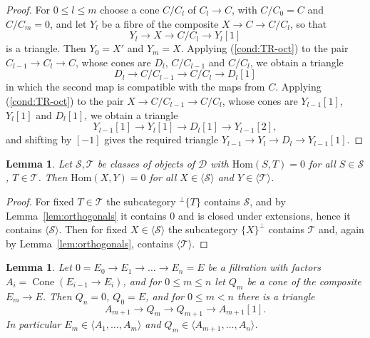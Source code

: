 \documentclass[12pt]{amsart}
\newcommand{\condref}[1]{\textup{(\ref{#1})}}
\newtheorem{lemma}[theorem]{Lemma}
\numberwithin{theorem}{section}
\theoremstyle{definition}
\newcommand{\Hom}{\mathrm{Hom}}
\newcommand{\calD}{\mathcal{D}}
\newcommand{\Cone}{\operatorname{Cone}}
\begin{document}
	\begin{proof}
		For $0 \leqslant l \leqslant m$ choose a cone $C / C_l$ of $C_l \to C$, with $C / C_0 = C$ and $C / C_m = 0$, and let $Y_l$ be a fibre of the composite $X \to C \to C / C_l$, so that
		\[
		Y_l \longrightarrow X \longrightarrow C / C_l \longrightarrow Y_l[1]
		\]
		is a triangle.
		Then $Y_0 = X'$ and $Y_m = X$.
		Applying \condref{cond:TR-oct} to the pair $C_{l-1} \to C_l \to C$, whose cones are $D_l$, $C / C_{l-1}$ and $C / C_l$, we obtain a triangle
		\[
		D_l \longrightarrow C / C_{l-1} \longrightarrow C / C_l \longrightarrow D_l[1]
		\]
		in which the second map is compatible with the maps from $C$.
		Applying \condref{cond:TR-oct} to the pair $X \to C / C_{l-1} \to C / C_l$, whose cones are $Y_{l-1}[1]$, $Y_l[1]$ and $D_l[1]$, we obtain a triangle
		\[
		Y_{l-1}[1] \longrightarrow Y_l[1] \longrightarrow D_l[1] \longrightarrow Y_{l-1}[2] ,
		\]
		and shifting by $[-1]$ gives the required triangle $Y_{l-1} \to Y_l \to D_l \to Y_{l-1}[1]$.
	\end{proof}
	
	\begin{lemma}
		\label{lem:devissage}
		Let $\mathcal{S}, \mathcal{T}$ be classes of objects of $\calD$ with $\Hom(S, T) = 0$ for all $S \in \mathcal{S}$, $T \in \mathcal{T}$.
		Then $\Hom(X, Y) = 0$ for all $X \in \langle \mathcal{S} \rangle$ and $Y \in \langle \mathcal{T} \rangle$.
	\end{lemma}
	
	\begin{proof}
		For fixed $T \in \mathcal{T}$ the subcategory ${}^{\perp}\{T\}$ contains $\mathcal{S}$, and by Lemma~\ref{lem:orthogonals} it contains $0$ and is closed under extensions, hence it contains $\langle \mathcal{S} \rangle$.
		Then for fixed $X \in \langle \mathcal{S} \rangle$ the subcategory $\{X\}^{\perp}$ contains $\mathcal{T}$ and, again by Lemma~\ref{lem:orthogonals}, contains $\langle \mathcal{T} \rangle$.
	\end{proof}
	
	\begin{lemma}
		\label{lem:cone_of_filtration}
		Let $0 = E_0 \to E_1 \to \ldots \to E_n = E$ be a filtration with factors $A_i = \Cone(E_{i-1} \to E_i)$, and for $0 \leqslant m \leqslant n$ let $Q_m$ be a cone of the composite $E_m \to E$.
		Then $Q_n = 0$, $Q_0 = E$, and for $0 \leqslant m < n$ there is a triangle
		\[
		A_{m+1} \longrightarrow Q_m \longrightarrow Q_{m+1} \longrightarrow A_{m+1}[1] .
		\]
		In particular $E_m \in \langle A_1, \ldots, A_m \rangle$ and $Q_m \in \langle A_{m+1}, \ldots, A_n \rangle$.
	\end{lemma}
	
\end{document}
